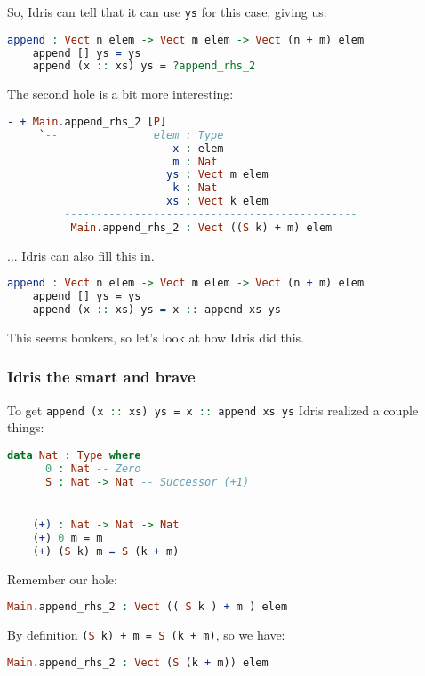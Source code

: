 \documentclass{beamer}
\begin{document}
\begin{frame}[fragile]
  So, Idris can tell that it can use \texttt{ys} for this case, giving us:

  \pause

  \begin{lstlisting}[language=Idris]
    append : Vect n elem -> Vect m elem -> Vect (n + m) elem
    append [] ys = ys
    append (x :: xs) ys = ?append_rhs_2
  \end{lstlisting}

  \pause

  The second hole is a bit more interesting:

  \begin{lstlisting}[language=Idris]
    - + Main.append_rhs_2 [P]
     `--               elem : Type
                          x : elem
                          m : Nat
                         ys : Vect m elem
                          k : Nat
                         xs : Vect k elem
         ----------------------------------------------
          Main.append_rhs_2 : Vect ((S k) + m) elem
  \end{lstlisting}

  \pause

  ... Idris can also fill this in.

  \pause

  \begin{lstlisting}[language=Idris]
    append : Vect n elem -> Vect m elem -> Vect (n + m) elem
    append [] ys = ys
    append (x :: xs) ys = x :: append xs ys
  \end{lstlisting}

  \pause

  This seems bonkers, so let's look at how Idris did this.
\end{frame}

\begin{frame}[fragile]
  \frametitle{Idris the smart and brave}

  To get \lstinline[language=Idris, columns=fixed]{append (x :: xs) ys = x :: append xs ys} Idris realized a couple things:

  \begin{lstlisting}[language=Idris]
    data Nat : Type where
      0 : Nat -- Zero
      S : Nat -> Nat -- Successor (+1)


    (+) : Nat -> Nat -> Nat
    (+) 0 m = m
    (+) (S k) m = S (k + m)
  \end{lstlisting}

  \pause
  Remember our hole:

  \begin{lstlisting}[language=Idris]
    Main.append_rhs_2 : Vect (( S k ) + m ) elem
  \end{lstlisting}

  \pause
  By definition \lstinline[language=Idris, columns=fixed]{(S k) + m = S (k + m)}, so we have:

  \pause
  \begin{lstlisting}[language=Idris]
    Main.append_rhs_2 : Vect (S (k + m)) elem
  \end{lstlisting}
\end{frame}
\end{document}
